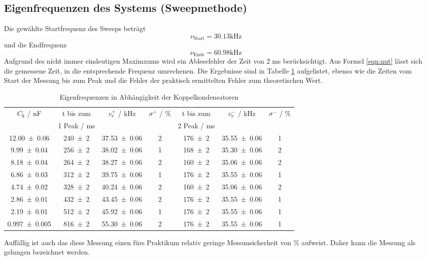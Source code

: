 \subsection{Eigenfrequenzen des Systems (Sweepmethode)}
Die gewählte Startfrequenz des Sweeps beträgt
\begin{equation}
  \nu_\text{Start} = 30.13 \text{kHz}
\end{equation}
und die Endfrequenz
\begin{equation}
  \nu_\text{Ende} = 60.98 \text{kHz}
\end{equation}
Aufgrund des nicht immer eindeutigen Maximxums wird ein Ablesefehler der Zeit von 2 ms berücksichtigt. Aus Formel \ref{eqn:nut} lässt sich die gemessene Zeit, in die entsprechende Frequenz umrechenen. Die Ergebnisse sind in Tabelle \ref{tab:beep} aufgelistet, ebenso wie die Zeiten vom Start der Messung bis zum Peak und die Fehler der praktisch ermittelten Fehler zum theoretischen Wert.
\begin{table}
  \centering
  \begin{tabular}{c c c c c c c}
    \toprule
    $C_\text{k}$ / nF & t bis zum & $v_\text{e}^+$ / kHz & $\sigma^+$ / \% & t bis zum & $v_\text{e}^-$ / kHz & $\sigma^-$ / \%  \\
    &1 Peak / ms& & & 2 Peak / ms & & \\
    \midrule
    \num{12.00 +- 0.06}     & \num{240 +- 2} &\num{37.53 +- 0.06} & 2 & \num{176 +- 2} & \num{35.55 +- 0.06} & 1 \\
    \num{9.99 +- 0.04}      & \num{256 +- 2} &\num{38.02 +- 0.06} & 1 & \num{168 +- 2} & \num{35.30 +- 0.06} & 2 \\
    \num{8.18 +- 0.04}      & \num{264 +- 2} &\num{38.27 +- 0.06} & 2 & \num{160 +- 2} & \num{35.06 +- 0.06} & 2 \\
    \num{6.86 +- 0.03}      & \num{312 +- 2} &\num{39.75 +- 0.06} & 1 & \num{176 +- 2} & \num{35.55 +- 0.06} & 1 \\
    \num{4.74 +- 0.02}      & \num{328 +- 2} &\num{40.24 +- 0.06} & 2 & \num{160 +- 2} & \num{35.06 +- 0.06} & 2 \\
    \num{2.86 +- 0.01}      & \num{432 +- 2} &\num{43.45 +- 0.06} & 2 & \num{176 +- 2} & \num{35.55 +- 0.06} & 1 \\
    \num{2.19 +- 0.01}      & \num{512 +- 2} &\num{45.92 +- 0.06} & 1 & \num{176 +- 2} & \num{35.55 +- 0.06} & 1 \\
    \num{0.997 +- 0.005}    & \num{816 +- 2} &\num{55.30 +- 0.06} & 2 & \num{176 +- 2} & \num{35.55 +- 0.06} & 1 \\
    \bottomrule
  \end{tabular}
  \caption{Eigenfrequenzen in Abhängigkeit der Koppelkondensatoren}
  \label{tab:beep}
\end{table}
Auffällig ist auch das diese Messung einen fürs Praktikum relativ geringe Messunsicherheit von  \% aufweist. Daher kann die Messung als gelungen bezeichnet werden.

